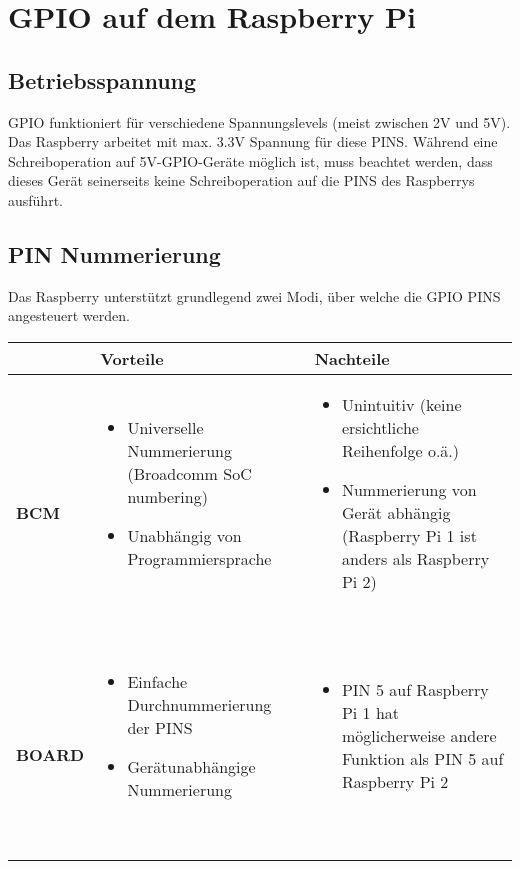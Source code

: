 \documentclass[a4paper,11pt]{article}
\begin{document}
\section{GPIO auf dem Raspberry Pi}
\subsection{Betriebsspannung}
GPIO funktioniert für verschiedene Spannungslevels (meist zwischen 2V und 5V). Das Raspberry arbeitet mit max. 3.3V Spannung für diese PINS. Während eine Schreiboperation auf 5V-GPIO-Geräte möglich ist, muss beachtet werden, dass dieses Gerät seinerseits keine Schreiboperation auf die PINS des Raspberrys ausführt.

\subsection{PIN Nummerierung}
Das Raspberry unterstützt grundlegend zwei Modi, über welche die GPIO PINS angesteuert werden.
\begin{tabular}{| p{2cm} | p{7cm} | p{7cm} | }
	\hline
	\textbf{} & \textbf{Vorteile} & \textbf{Nachteile} \\\hline
	\textbf{BCM} & 
			\begin{itemize}
				\item Universelle Nummerierung (Broadcomm SoC numbering)
				\item Unabhängig von Programmiersprache
			\end{itemize}~& 
			\begin{itemize}
				\item Unintuitiv (keine ersichtliche Reihenfolge o.ä.)
				\item Nummerierung von Gerät abhängig (Raspberry Pi 1 ist anders als Raspberry Pi 2)
			\end{itemize}~
	\\\hline
	\textbf{BOARD} & 
		\begin{itemize}
			\item Einfache Durchnummerierung der PINS
			\item Gerätunabhängige Nummerierung
		\end{itemize}~& 
		\begin{itemize}
			\item PIN 5 auf Raspberry Pi 1 hat möglicherweise andere Funktion als PIN 5 auf Raspberry Pi 2
		\end{itemize}~
	\\\hline
\end{tabular}
\end{document}
